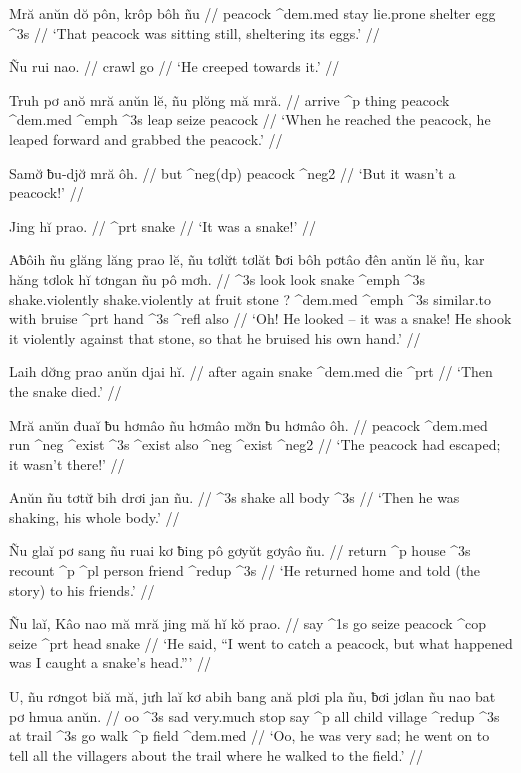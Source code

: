 \gla Mră anŭn dŏ pôn, krôp bôh ñu //
\glb peacock {\sc^dem.med} stay lie.prone shelter egg {\sc^3s} //
\glft `That peacock was sitting still, sheltering its eggs.' //


\gla Ñu rui nao. //
 crawl go //
\glft `He creeped towards it.' //


\gla Truh pơ anŏ mră anŭn lĕ, ñu plŏng mă mră. //
\glb arrive {\sc^p} thing peacock {\sc^dem.med} {\sc^emph} {\sc^3s} leap seize peacock //
\glft `When he reached the peacock, he leaped forward and grabbed the peacock.' //


\gla Samơ̆ ƀu-djơ̆ mră ôh. //
\glb but {\sc^neg(dp)} peacock {\sc^neg2} //
\glft `But it wasn't a peacock!' //


\gla Jing hĭ prao. //
 {\sc^prt} snake //
\glft `It was a snake!' //


\gla Aƀôih ñu glăng lăng prao lĕ, ñu tơlư̆t tơlăt ƀơi bôh pơtâo đên anŭn lĕ ñu, kar hăng tơlok hĭ tơngan ñu pô mơh. //
 {\sc^3s} look look snake {\sc^emph} {\sc^3s} shake.violently shake.violently at fruit stone ? {\sc^dem.med} {\sc^emph} {\sc^3s} similar.to with bruise {\sc^prt} hand {\sc^3s} {\sc^refl} also //
\glft `Oh! He looked -- it was a snake! He shook it violently against that stone, so that he bruised his own hand.' //


\gla Laih dơ̆ng prao anŭn djai hĭ. //
\glb after again snake {\sc^dem.med} die {\sc^prt} //
\glft `Then the snake died.' //


\gla Mră anŭn đuaĭ ƀu hơmâo ñu hơmâo mơ̆n ƀu hơmâo ôh. //
\glb peacock {\sc^dem.med} run {\sc^neg} {\sc^exist} {\sc^3s} {\sc^exist} also {\sc^neg} {\sc^exist} {\sc^neg2} //
\glft `The peacock had escaped; it wasn't there!' //


\gla Anŭn ñu tơtư̆ bih {drơi jan} ñu. //
 {\sc^3s} shake all body {\sc^3s} //
\glft `Then he was shaking, his whole body.' //


\gla Ñu glaĭ pơ sang ñu ruai kơ ƀing pô gơyŭt gơyâo ñu. //
 return {\sc^p} house {\sc^3s} recount {\sc^p} {\sc^pl} person friend {\sc^redup} {\sc^3s} //
\glft `He returned home and told (the story) to his friends.' //


\gla Ñu laĭ, Kâo nao mă mră jing mă hĭ kŏ prao. //
 say {\sc^1s} go seize peacock {\sc^cop} seize {\sc^prt} head snake //
\glft `He said, ``I went to catch a peacock, but what happened was I caught a snake's head.''' //


\gla U, ñu rơngot {biă mă}, jưh laĭ kơ {abih bang} ană plơi pla ñu, ƀơi jơlan ñu nao bat pơ hmua anŭn. //
\glb oo {\sc^3s} sad very.much stop say {\sc^p} all child village {\sc^redup} {\sc^3s} at trail {\sc^3s} go walk {\sc^p} field {\sc^dem.med} //
\glft `Oo, he was very sad; he went on to tell all the villagers about the trail where he walked to the field.' //


